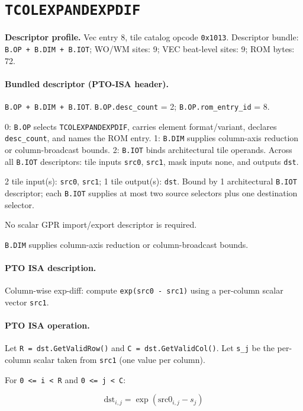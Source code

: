 \section{\texttt{TCOLEXPANDEXPDIF}}
\noindent\textbf{Descriptor profile.} Vec entry 8, tile catalog opcode \texttt{0x1013}. Descriptor bundle: \texttt{B.OP + B.DIM + B.IOT}; WO/WM sites: 9; VEC beat-level sites: 9; ROM bytes: 72.\par\smallskip
{}
\paragraph{Bundled descriptor (PTO-ISA header).}
\begin{description}[leftmargin=0.18\linewidth,style=nextline]
\item[Bundle] \texttt{B.OP + B.DIM + B.IOT}. \texttt{B.OP.desc\_count} = 2; \texttt{B.OP.rom\_entry\_id} = 8.
\item[Assembly] 0: \texttt{B.OP} selects \texttt{TCOLEXPANDEXPDIF}, carries element format/variant, declares \texttt{desc\_count}, and names the ROM entry. 1: \texttt{B.DIM} supplies column-axis reduction or column-broadcast bounds. 2: \texttt{B.IOT} binds architectural tile operands. Across all \texttt{B.IOT} descriptors: tile inputs \texttt{src0}, \texttt{src1}, mask inputs none, and outputs \texttt{dst}.
\item[Tile operands] 2 tile input(s): \texttt{src0}, \texttt{src1}; 1 tile output(s): \texttt{dst}. Bound by 1 architectural \texttt{B.IOT} descriptor; each \texttt{B.IOT} supplies at most two source selectors plus one destination selector.
\item[Scalar GPR operands] No scalar GPR import/export descriptor is required.
\item[Metadata operands] \texttt{B.DIM} supplies column-axis reduction or column-broadcast bounds.
\end{description}
\par\smallskip
{\small
\paragraph{PTO ISA description.}
Column-wise exp-diff: compute \texttt{exp(src0 - src1)} using a per-column scalar vector \texttt{src1}.
\paragraph{PTO ISA operation.}
Let \texttt{R = dst.GetValidRow()} and \texttt{C = dst.GetValidCol()}. Let \texttt{s\_j} be the per-column scalar taken from \texttt{src1} (one value per column).

For \texttt{0 \textless{}= i \textless{} R} and \texttt{0 \textless{}= j \textless{} C}:

\[
\mathrm{dst}_{i,j} = \exp(\mathrm{src0}_{i,j} - s_j)
\]
}\par\smallskip
